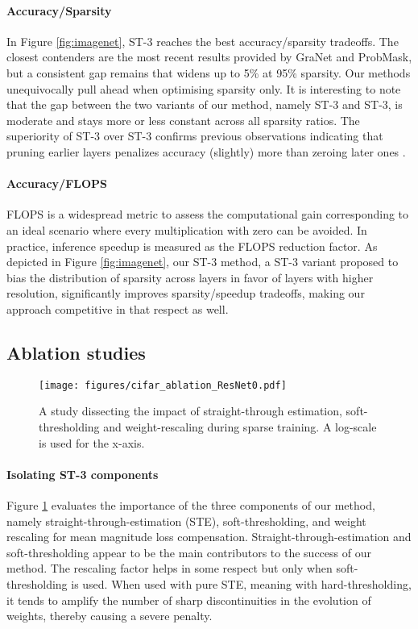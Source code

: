 \documentclass[10pt,twocolumn,letterpaper]{article}
\begin{document}
\paragraph{Accuracy/Sparsity}
In Figure \ref{fig:imagenet}, ST-3 reaches the best accuracy/sparsity tradeoffs. The closest contenders are the most recent results provided by GraNet and ProbMask, but a consistent gap remains that widens up to 5\% at 95\% sparsity. Our methods unequivocally pull ahead when optimising sparsity only. It is interesting to note that the gap between the two variants of our method, namely ST-3 and ST-3, is moderate and stays more or less constant across all sparsity ratios. The superiority of ST-3 over ST-3 confirms previous observations indicating that pruning earlier layers penalizes accuracy (slightly) more than zeroing later ones \cite{Evci2020}. 

\paragraph{Accuracy/FLOPS}
FLOPS is a widespread metric to assess the computational gain corresponding to an ideal scenario where every multiplication with zero can be avoided. In practice, inference speedup is measured as the FLOPS reduction factor. As depicted in Figure \ref{fig:imagenet}, our ST-3 method, a ST-3 variant proposed to bias the distribution of sparsity across layers in favor of layers with higher resolution, significantly improves sparsity/speedup tradeoffs, making our approach competitive in that respect as well. 





\subsection{Ablation studies}\label{sec:ablation}
\begin{figure}
  \centering
    \texttt{[image: figures/cifar\_ablation\_ResNet0.pdf]}
  \caption{A study dissecting the impact of straight-through estimation, soft-thresholding and weight-rescaling during sparse training. A log-scale is used for the x-axis.}\label{fig:ablation}
\end{figure}
\paragraph{Isolating ST-3 components} Figure \ref{fig:ablation} evaluates the importance of the three components of our method, namely straight-through-estimation (STE), soft-thresholding, and weight rescaling for mean magnitude loss compensation. Straight-through-estimation and soft-thresholding appear to be the main contributors to the success of our method. The rescaling factor helps in some respect but only when soft-thresholding is used. When used with pure STE, meaning with hard-thresholding, it tends to amplify the number of sharp discontinuities in the evolution of weights, thereby causing a severe penalty. 
\end{document}
